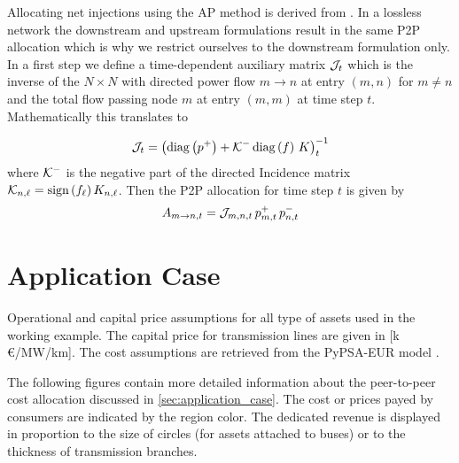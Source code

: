 \documentclass[11pt,twocolumn]{article}
\newcommand{\netconsumption}[1][n]{p^{-}_{#1,t}}
\newcommand{\netproduction}[1][n]{p^{+}_{#1,t}}
\newcommand{\incidence}[1][n]{K_{#1,\ell}}
\newcommand{\allocatepeer}[1][m \rightarrow n]{A_{#1,t}}
\begin{document}
Allocating net injections using the AP method is derived from \cite{achayuthakan_electricity_2010}. In a lossless network the downstream and upstream formulations result in the same P2P allocation which is why we restrict ourselves to the downstream formulation only. In a first step we define a time-dependent auxiliary matrix $\mathcal{J}_t$ which is the inverse of the $N\times N$ with directed power flow $m \rightarrow n$ at entry $(m, n)$ for $m \ne n$ and the total flow passing node $m$ at entry $\left( m, m\right)$ at time step $t$. Mathematically this translates to


\begin{align}
\mathcal{J}_t = \left( \operatorname{diag}\left(p^+\right) + \mathcal{K}^- \operatorname{diag}\left(f\right) \, K \right)_t^{-1} 
\end{align}
where $\mathcal{K}^-$ is the negative part of the directed Incidence matrix $\DirectedIncidence_{n,\ell} = \text{sign}\left( f_\ell \right)  \incidence$. Then the P2P allocation for time step $t$ is given by
\begin{align}
\allocatepeer = \InverseAPInjection_{m,n,t} \, \netproduction[m] \, \netconsumption
\end{align}

\newpage
\section{Application Case}
\label{sec:application_case_appendix}

\begin{table}[h]
    \centering
        
    \caption{Operational and capital price assumptions for all type of assets used in the working example. The capital price for transmission lines are given in [k\,\euro/MW/km]. The cost assumptions are retrieved from the PyPSA-EUR model \cite{horsch_jonas_pypsa-eur_2020}.}
    \label{tab:cost_assumptions}
\end{table} 


The following figures contain more detailed information about the peer-to-peer cost allocation discussed in \cref{sec:application_case}. The cost or prices payed by consumers are indicated by the region color. The dedicated revenue is displayed in proportion to the size of circles (for assets attached to buses) or to the thickness of transmission branches.    
\end{document}
